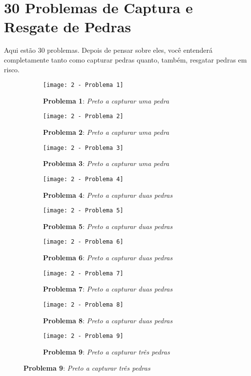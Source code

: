 \pagebreak

\section{30 Problemas de Captura e Resgate de Pedras}

Aqui estão 30 problemas. Depois de pensar sobre eles, você entenderá completamente tanto como capturar pedras quanto, também, resgatar pedras em risco.

\begin{figure}[h]
    \centering
    \captionsetup{justification=raggedright,singlelinecheck=false}
    \begin{subfigure}[t]{.3\textwidth}
        \texttt{[image: 2 - Problema 1]}
        \caption*{\textbf{Problema 1}: \emph{Preto a capturar uma pedra}}
    \end{subfigure}
    \hfill
    \begin{subfigure}[t]{.3\textwidth}
        \texttt{[image: 2 - Problema 2]}
        \caption*{\textbf{Problema 2}: \emph{Preto a capturar uma pedra}}
    \end{subfigure}
    \hfill
    \begin{subfigure}[t]{.3\textwidth}
        \texttt{[image: 2 - Problema 3]}
        \caption*{\textbf{Problema 3}: \emph{Preto a capturar uma pedra}}
    \end{subfigure}
    \par\bigskip
    \begin{subfigure}[t]{.3\textwidth}
        \texttt{[image: 2 - Problema 4]}
        \caption*{\textbf{Problema 4}: \emph{Preto a capturar duas pedras}}
    \end{subfigure}
    \hfill
    \begin{subfigure}[t]{.3\textwidth}
        \texttt{[image: 2 - Problema 5]}
        \caption*{\textbf{Problema 5}: \emph{Preto a capturar duas pedras}}
    \end{subfigure}
    \hfill
    \begin{subfigure}[t]{.3\textwidth}
        \texttt{[image: 2 - Problema 6]}
        \caption*{\textbf{Problema 6}: \emph{Preto a capturar duas pedras}}
    \end{subfigure}
    \par\bigskip
    \begin{subfigure}[t]{.3\textwidth}
        \texttt{[image: 2 - Problema 7]}
        \caption*{\textbf{Problema 7}: \emph{Preto a capturar duas pedras}}
    \end{subfigure}
    \hfill
    \begin{subfigure}[t]{.3\textwidth}
        \texttt{[image: 2 - Problema 8]}
        \caption*{\textbf{Problema 8}: \emph{Preto a capturar duas pedras}}
    \end{subfigure}
    \hfill
    \begin{subfigure}[t]{.3\textwidth}
        \texttt{[image: 2 - Problema 9]}
        \caption*{\textbf{Problema 9}: \emph{Preto a capturar três pedras}}
    \end{subfigure}
\end{figure}

